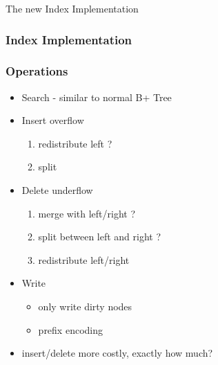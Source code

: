 \documentclass{beamer}
\begin{document}
  \begin{section}{The new Index Implementation}
    \begin{frame}
        \frametitle{Index Implementation}
        \begin{figure}
        \centering
        \end{figure}
    \end{frame}

    \begin{frame}
        \frametitle{Operations}
        \begin{itemize}
        \pause
        \item Search - similar to normal B+ Tree
        \pause
        \item Insert overflow
            \begin{enumerate}
            \item redistribute left ?
            \item split 
            \end{enumerate}
        \pause
        \item Delete underflow
            \begin{enumerate}
            \item merge with left/right ?
            \item split between left and right ?
            \item redistribute left/right
            \end{enumerate}
        \pause
        \item Write
            \begin{itemize}
              \item only write dirty nodes
              \item prefix encoding
            \end{itemize}
        \pause 
        \item insert/delete more costly, exactly how much?
        \end{itemize}
    \end{frame}
  \end{section}
\end{document}
